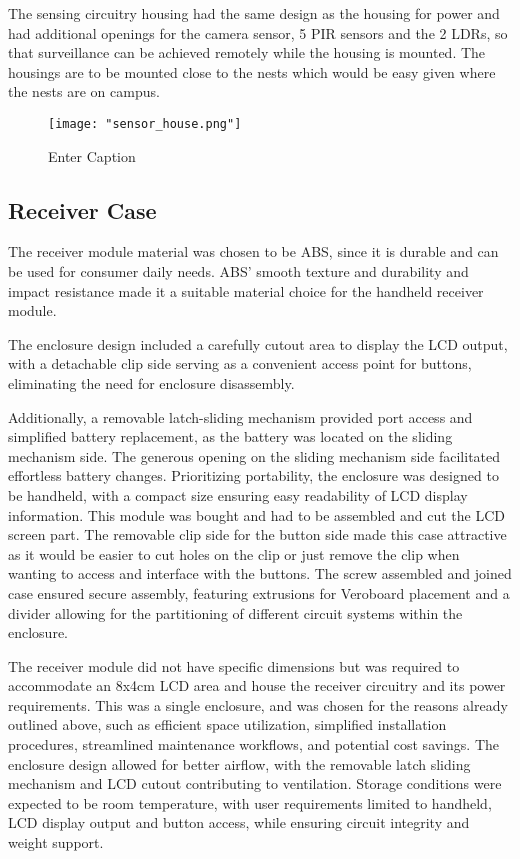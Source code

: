 \documentclass[class=report,11pt,crop=false]{standalone}
\begin{document}
 
The sensing circuitry housing had the same design as the housing for power and had additional openings for the camera sensor, 5 PIR sensors and the 2 LDRs, so that surveillance can be achieved remotely while the housing is mounted. The housings are to be mounted close to the nests which would be easy given where the nests are on campus. 

\begin{figure}[H]
    \centering
    \texttt{[image: "sensor\_house.png"]}
    \caption{Enter Caption}
    \label{fig:enter-label4}
\end{figure}

 
\subsection{Receiver Case}
The receiver module material was chosen to be ABS, since it is durable and can be used for consumer daily needs. ABS’ smooth texture and durability and impact resistance made it a suitable material choice for the handheld receiver module.
\newline

The enclosure design included a carefully cutout area to display the LCD output, with a detachable clip side serving as a convenient access point for buttons, eliminating the need for enclosure disassembly. 
\newline

Additionally, a removable latch-sliding mechanism provided port access and simplified battery replacement, as the battery was located on the sliding mechanism side. The generous opening on the sliding mechanism side facilitated effortless battery changes. Prioritizing portability, the enclosure was designed to be handheld, with a compact size ensuring easy readability of LCD display information. This module was bought and had to be assembled and cut the LCD screen part. The removable clip side for the button side made this case attractive as it would be easier to cut holes on the clip or just remove the clip when wanting to access and interface with the buttons. The screw assembled and joined case ensured secure assembly, featuring extrusions for Veroboard placement and a divider allowing for the partitioning of different circuit systems within the enclosure.
\newline

The receiver module did not have specific dimensions but was required to accommodate an 8x4cm LCD area and house the receiver circuitry and its power requirements. This was a single enclosure, and was chosen for the reasons already outlined above, such as efficient space utilization, simplified installation procedures, streamlined maintenance workflows, and potential cost savings. The enclosure design allowed for better airflow, with the removable latch sliding mechanism and LCD cutout contributing to ventilation. Storage conditions were expected to be room temperature, with user requirements limited to handheld, LCD display output and button access, while ensuring circuit integrity and weight support.
\end{document}
